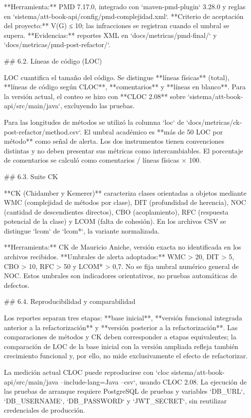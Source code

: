 **Herramienta:** PMD 7.17.0, integrado con `maven-pmd-plugin` 3.28.0 y reglas en `sistema/att-book-api/config/pmd-complejidad.xml`. **Criterio de aceptación del proyecto:** V(G) ≤ 10; las infracciones se registran cuando el umbral se supera. **Evidencias:** reportes XML en `docs/metricas/pmd-final/` y `docs/metricas/pmd-post-refactor/`.

## 6.2. Líneas de código (LOC)

LOC cuantifica el tamaño del código. Se distingue **líneas físicas** (total), **líneas de código según CLOC**, **comentarios** y **líneas en blanco**. Para la versión actual, el conteo se hizo con **CLOC 2.08** sobre `sistema/att-book-api/src/main/java`, excluyendo las pruebas.

Para las longitudes de métodos se utilizó la columna `loc` de `docs/metricas/ck-post-refactor/method.csv`. El umbral académico es **más de 50 LOC por método** como señal de alerta. Los dos instrumentos tienen convenciones distintas y no deben presentar sus métricas como intercambiables. El porcentaje de comentarios se calculó como comentarios / líneas físicas × 100.

## 6.3. Suite CK

**CK (Chidamber y Kemerer)** caracteriza clases orientadas a objetos mediante WMC (complejidad de métodos por clase), DIT (profundidad de herencia), NOC (cantidad de descendientes directos), CBO (acoplamiento), RFC (respuesta potencial de la clase) y LCOM (falta de cohesión). En los archivos CSV se distingue `lcom` de `lcom*`, la variante normalizada.

**Herramienta:** CK de Mauricio Aniche, versión exacta no identificada en los archivos recibidos. **Umbrales de alerta adoptados:** WMC > 20, DIT > 5, CBO > 10, RFC > 50 y LCOM* > 0,7. No se fija umbral numérico general de NOC. Estos umbrales son indicadores orientativos, no pruebas automáticas de defectos.

## 6.4. Reproducibilidad y comparabilidad

Los reportes separan tres etapas: **base inicial**, **versión funcional integrada anterior a la refactorización** y **versión posterior a la refactorización**. Las comparaciones de métodos y CK deben corresponder a etapas equivalentes; la comparación de LOC de la base inicial con la versión ampliada refleja también crecimiento funcional y, por ello, no mide exclusivamente el efecto de refactorizar.

La medición actual CLOC puede reproducirse con `cloc sistema/att-book-api/src/main/java --include-lang=Java --csv`, usando CLOC 2.08. La ejecución de las pruebas de arranque requiere PostgreSQL de pruebas y variables `DB_URL`, `DB_USERNAME`, `DB_PASSWORD` y `JWT_SECRET`, sin reutilizar credenciales de producción.

